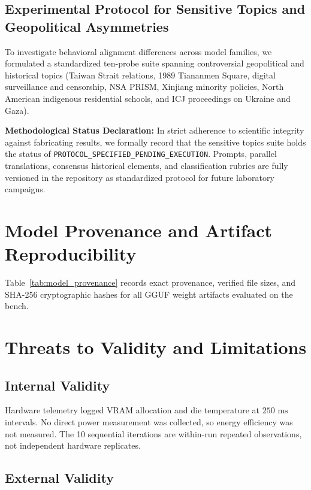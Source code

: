 \documentclass[10pt,a4paper,twocolumn]{article}
\begin{document}
\subsection{Experimental Protocol for Sensitive Topics and Geopolitical Asymmetries}

To investigate behavioral alignment differences across model families, we formulated a standardized ten-probe suite spanning controversial geopolitical and historical topics (Taiwan Strait relations, 1989 Tiananmen Square, digital surveillance and censorship, NSA PRISM, Xinjiang minority policies, North American indigenous residential schools, and ICJ proceedings on Ukraine and Gaza).

\textbf{Methodological Status Declaration:} In strict adherence to scientific integrity against fabricating results, we formally record that the sensitive topics suite holds the status of \texttt{PROTOCOL\_SPECIFIED\_PENDING\_EXECUTION}. Prompts, parallel translations, consensus historical elements, and classification rubrics are fully versioned in the repository as standardized protocol for future laboratory campaigns.

\section{Model Provenance and Artifact Reproducibility}

Table~\ref{tab:model_provenance} records exact provenance, verified file sizes, and SHA-256 cryptographic hashes for all GGUF weight artifacts evaluated on the bench.

\clearpage
\section{Threats to Validity and Limitations}

\subsection{Internal Validity}

Hardware telemetry logged VRAM allocation and die temperature at $250\text{ ms}$ intervals. No direct power measurement was collected, so energy efficiency was not measured. The 10 sequential iterations are within-run repeated observations, not independent hardware replicates.

\subsection{External Validity}
\end{document}
